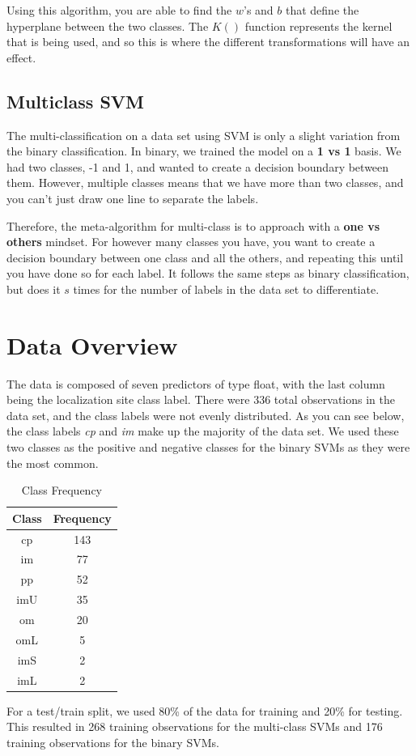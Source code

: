 \documentclass[12pt]{article}
\begin{document}
Using this algorithm, you are able to find the $w$'s and $b$ that define the hyperplane between the two classes. The $K()$ function represents the kernel that is being used, and so this is where the different transformations will have an effect. 

\subsection{Multiclass SVM}
The multi-classification on a data set using SVM is only a slight variation from the binary classification. In binary, we trained the model on a \textbf{1 vs 1} basis. We had two classes, -1 and 1, and wanted to create a decision boundary between them. However, multiple classes means that we have more than two classes, and you can't just draw one line to separate the labels.

Therefore, the meta-algorithm for multi-class is to approach with a \textbf{one vs others} mindset. For however many classes you have, you want to create a decision boundary between one class and all the others, and repeating this until you have done so for each label. It follows the same steps as binary classification, but does it $s$ times for the number of labels in the data set to differentiate. 
\section{Data Overview}
The data is composed of seven predictors of type float, with the last column being the localization site class label.
There were 336 total observations in the data set, and the class labels were not evenly distributed.
As you can see below, the class labels \textit{cp} and \textit{im} make up the majority of the data set.
We used these two classes as the positive and negative classes for the binary SVMs as they were the most common.
\begin{table}[h]
    \centering
    \caption{Class Frequency}
    \label{tab:class_frequency}
    \begin{tabular}{cc}
        \toprule
        \textbf{Class} & \textbf{Frequency} \\
        \midrule
        cp & 143 \\
        im & 77 \\
        pp & 52 \\
        imU & 35 \\
        om & 20 \\
        omL & 5 \\
        imS & 2 \\
        imL & 2 \\
        \bottomrule
    \end{tabular}
\end{table}
For a test/train split, we used 80\% of the data for training and 20\% for testing.
This resulted in 268 training observations for the multi-class SVMs and 176 training observations for the binary SVMs.
\end{document}
